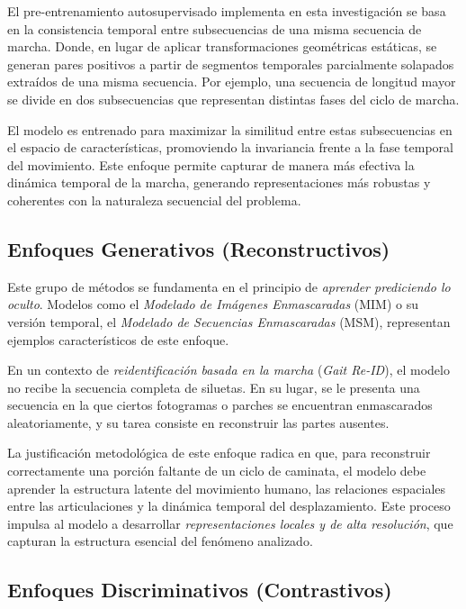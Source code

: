 El pre-entrenamiento autosupervisado implementa en esta investigación se basa en la consistencia temporal entre subsecuencias de una misma secuencia de marcha. Donde, en lugar de aplicar transformaciones geométricas estáticas, se generan pares positivos a partir de segmentos temporales parcialmente solapados extraídos de una misma secuencia. Por ejemplo, una secuencia de longitud mayor se divide en dos subsecuencias que representan distintas fases del ciclo de marcha.

El modelo es entrenado para maximizar la similitud entre estas subsecuencias en el espacio de características, promoviendo la invariancia frente a la fase temporal del movimiento. Este enfoque permite capturar de manera más efectiva la dinámica temporal de la marcha, generando representaciones más robustas y coherentes con la naturaleza secuencial del problema. 

\subsection{Enfoques Generativos (Reconstructivos)}

Este grupo de métodos se fundamenta en el principio de \textit{aprender prediciendo lo oculto}. Modelos como el \textit{Modelado de Imágenes Enmascaradas} (MIM) o su versión temporal, el \textit{Modelado de Secuencias Enmascaradas} (MSM), representan ejemplos característicos de este enfoque.  

En un contexto de \textit{reidentificación basada en la marcha} (\textit{Gait Re-ID}), el modelo no recibe la secuencia completa de siluetas. En su lugar, se le presenta una secuencia en la que ciertos fotogramas o parches se encuentran enmascarados aleatoriamente, y su tarea consiste en reconstruir las partes ausentes.  

La justificación metodológica de este enfoque radica en que, para reconstruir correctamente una porción faltante de un ciclo de caminata, el modelo debe aprender la estructura latente del movimiento humano, las relaciones espaciales entre las articulaciones y la dinámica temporal del desplazamiento. Este proceso impulsa al modelo a desarrollar \textit{representaciones locales y de alta resolución}, que capturan la estructura esencial del fenómeno analizado.  

\subsection{Enfoques Discriminativos (Contrastivos)}

